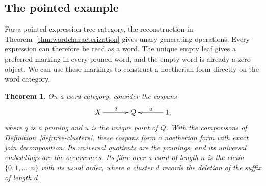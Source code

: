 \documentclass[11pt,a4paper]{article}
\theoremstyle{plain}
\newtheorem{theorem}{Theorem}[section]
\theoremstyle{definition}
\theoremstyle{remark}
\begin{document}
\subsection{The pointed example}\label{sec:word-noetherian-form}
For a pointed expression tree category, the reconstruction in
Theorem~\ref{thm:wordcharacterization} gives unary generating
operations. Every expression can therefore be read as a word.
The unique empty leaf gives a preferred marking in every pruned
word, and the empty word is already a zero object. We can use
these markings to construct a noetherian form directly on the
word category.

\begin{theorem}\label{thm:word-noetherian}
On a word category, consider the cospans
\[
\xymatrix@C=3.5em{
X\ar[r]^q&Q&1\ar[l]_u,
}
\]
where $q$ is a pruning and $u$ is the unique point of $Q$.
With the comparisons of Definition~\ref{def:tree-clusters},
these cospans form a noetherian form with exact join decomposition.
Its universal quotients are the prunings, and its universal
embeddings are the occurrences.
Its fibre over a word of length $n$ is the chain
$\{0,1,\ldots,n\}$ with its usual order, where a cluster
$d$ records the deletion of the suffix of length $d$.
\end{theorem}
\end{document}
